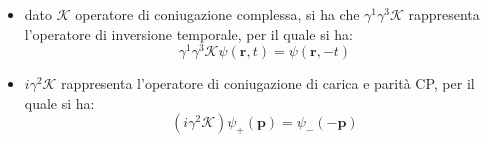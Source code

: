 \documentclass{subnucbo}
\begin{document}
\begin{itemize}
\begin{equation}
        \end{equation}
        \item dato $\mathcal{K}$ operatore di coniugazione complessa, si ha che $\gamma ^ { 1 } \gamma ^ { 3 } \mathcal { K }$ rappresenta l'operatore di inversione temporale, per il quale si ha:
        \begin{equation}
                \gamma ^ { 1 } \gamma ^ { 3 } \mathcal { K } \psi ( \mathbf { r } , t ) = \psi ( \mathbf { r } , - t )
        \end{equation}
        \item $i \gamma ^ { 2 } \mathcal { K }$ rappresenta l'operatore di coniugazione di carica e parità CP, per il quale si ha:
        \begin{equation}
                \left( i \gamma ^ { 2 } \mathcal { K } \right) \psi _ { + } (\mathbf{p}) = \psi _ { - } ( - \mathbf { p } )
        \end{equation}
\end{itemize}
\end{document}
